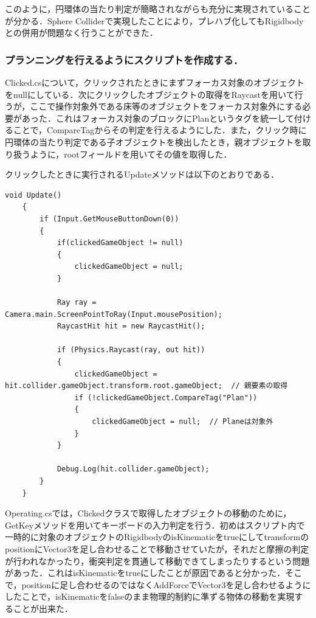 \documentclass[12pt]{jarticle}
\begin{document}
このように，円環体の当たり判定が簡略されながらも充分に実現されていることが分かる．Sphere Colliderで実現したことにより，プレハブ化してもRigidbodyとの併用が問題なく行うことができた．

\subsubsection{プランニングを行えるようにスクリプトを作成する．}
Clicked.csについて，クリックされたときにまずフォーカス対象のオブジェクトをnullにしている．次にクリックしたオブジェクトの取得をRaycastを用いて行うが，ここで操作対象外である床等のオブジェクトをフォーカス対象外にする必要があった．これはフォーカス対象のブロックにPlanというタグを統一して付けることで，CompareTagからその判定を行えるようにした．また，クリック時に円環体の当たり判定である子オブジェクトを検出したとき，親オブジェクトを取り扱うように，rootフィールドを用いてその値を取得した．

クリックしたときに実行されるUpdateメソッドは以下のとおりである．

\begin{lstlisting}[caption=ClickedクラスのUpdateメソッド, label=clicked]
    void Update()
    {
        if (Input.GetMouseButtonDown(0))
        {
            if(clickedGameObject != null)
            {
                clickedGameObject = null;
            }

            Ray ray = Camera.main.ScreenPointToRay(Input.mousePosition);
            RaycastHit hit = new RaycastHit();

            if (Physics.Raycast(ray, out hit))
            {
                clickedGameObject = hit.collider.gameObject.transform.root.gameObject;  // 親要素の取得
                if (!clickedGameObject.CompareTag("Plan"))
                {
                    clickedGameObject = null;  // Planeは対象外
                }
            }

            Debug.Log(hit.collider.gameObject);
        }
    }
\end{lstlisting}

Operating.csでは，Clickedクラスで取得したオブジェクトの移動のために，GetKeyメソッドを用いてキーボードの入力判定を行う．初めはスクリプト内で一時的に対象のオブジェクトのRigidbodyのisKinematicをtrueにしてtransformのpositionにVector3を足し合わせることで移動させていたが，それだと摩擦の判定が行われなかったり，衝突判定を貫通して移動できてしまったりするという問題があった．これはisKinematicをtrueにしたことが原因であると分かった．そこで，positionに足し合わせるのではなくAddForceでVector3を足し合わせるようにしたことで，isKinematicをfalseのまま物理的制約に準ずる物体の移動を実現することが出来た．
\end{document}
